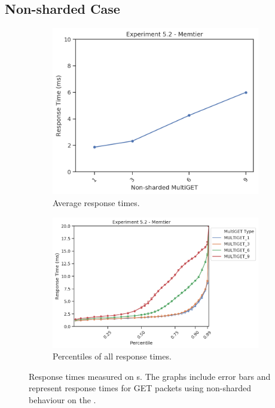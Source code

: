     \subsection{Non-sharded Case\label{subsec:5_nonsharded}}

        \begin{figure}
            \vspace*{-.5\baselineskip}
                \centering
            \begin{subfigure}[t!]{0.43\textwidth}
                \centering
                \includegraphics[width=\textwidth]{../data_analysis/figures/5-2_mt_response-time.png}
                \caption{Average response times.\label{fig:noshard_mt_rt}}
            \end{subfigure}
            \begin{subfigure}[t!]{0.56\textwidth}
                \centering
                \includegraphics[width=\textwidth]{../data_analysis/figures/5-2_mt_percentiles.png}
                \caption{Percentiles of all response times.\label{fig:noshard_mt_rt_percentiles}}
            \end{subfigure}
            \caption{Response times measured on \cli{}s. The graphs include error bars and represent response times
                     for GET packets using non-sharded behaviour on the \mw.\label{fig:noshard_mt}}
        \end{figure}

